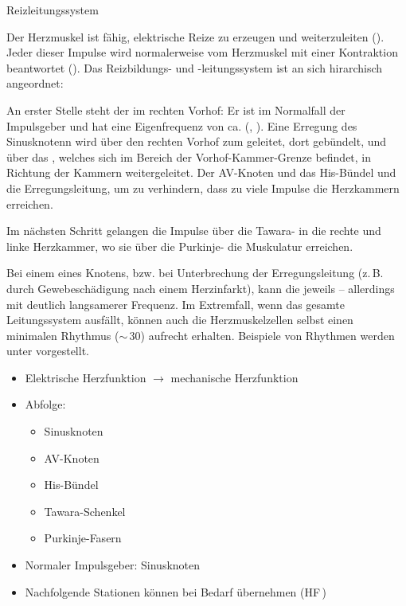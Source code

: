 \TextSlidePicture
{Reizleitungssystem}%
{%
%
\label{topic:reizleitungssystem}%
Der Herzmuskel ist fähig, 
elektrische Reize zu erzeugen 
und weiterzuleiten 
().
Jeder
dieser Impulse wird normalerweise vom Herzmuskel mit einer
Kontraktion beantwortet ().
Das Reizbildungs- und -leitungssystem ist an sich hirarchisch angeordnet:

An erster Stelle steht der   im rechten Vorhof: 
Er ist im Normalfall der Impulsgeber 
und hat eine Eigenfrequenz von ca. \PerMin* 
(, ). 
%
Eine Erregung des Sinusknotenn wird über den rechten Vorhof zum 
  geleitet, dort gebündelt, und über
das , welches sich im Bereich der
Vorhof-Kammer-Grenze befindet, in Richtung der Kammern
weitergeleitet. Der AV-Knoten und das His-Bündel 
 und  die Erregungsleitung, um zu
verhindern, dass zu viele Impulse die Herzkammern erreichen.

Im nächsten Schritt gelangen die Impulse über die
Tawara- in die rechte und linke Herzkammer, wo
sie über die Purkinje- die Muskulatur erreichen.

Bei einem  eines Knotens, bzw. bei Unterbrechung
der Erregungsleitung (z.\,B. durch Gewebeschädigung nach
einem Herzinfarkt), kann die jeweils  -- allerdings mit deutlich
langsamerer Frequenz. Im Extremfall, wenn
das gesamte Leitungssystem ausfällt, können auch die
Herzmuskelzellen selbst einen minimalen Rhythmus
($\sim$\,30\PerMin*) aufrecht erhalten.
%
Beispiele von Rhythmen werden unter 
vorgestellt.
}%
{
\begin{itemize}
  \item Elektrische Herzfunktion $\rightarrow$ mechanische Herzfunktion
  \item Abfolge:
  \begin{itemize}
    \item Sinusknoten 
    \item AV-Knoten 
    \item His-Bündel
    \item Tawara-Schenkel
    \item Purkinje-Fasern
  \end{itemize}
  \item Normaler Impulsgeber: Sinusknoten
  \item Nachfolgende Stationen können bei Bedarf übernehmen (HF\,)
\end{itemize}}%
